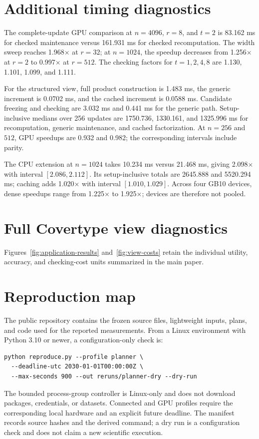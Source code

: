 \documentclass[10pt]{article}
\begin{document}
\section{Additional timing diagnostics}
The complete-update GPU comparison at $n=4096$, $r=8$, and $t=2$ is
83.162 ms for checked maintenance versus 161.931 ms for checked
recomputation. The width sweep reaches 1.968$\times$ at $r=32$; at
$n=1024$, the speedup decreases from 1.256$\times$ at $r=2$ to
0.997$\times$ at $r=512$. The checking factors for $t=1,2,4,8$ are
1.130, 1.101, 1.099, and 1.111.

For the structured view, full product construction is 1.483 ms, the generic
increment is 0.0702 ms, and the cached increment is 0.0588 ms. Candidate
freezing and checking are 3.032 ms and 0.441 ms for the generic path.
Setup-inclusive medians over 256 updates are 1750.736, 1330.161, and
1325.996 ms for recomputation, generic maintenance, and cached
factorization. At $n=256$ and $512$, GPU speedups are 0.932 and 0.982;
the corresponding intervals include parity.

The CPU extension at $n=1024$ takes 10.234 ms versus 21.468 ms,
giving 2.098$\times$ with interval $[2.086,2.112]$. Its setup-inclusive
totals are 2645.888 and 5520.294 ms; caching adds 1.020$\times$ with
interval $[1.010,1.029]$. Across four GB10 devices, dense speedups range
from 1.225$\times$ to 1.925$\times$; devices are therefore not pooled.

\section{Full Covertype view diagnostics}
Figures~\ref{fig:application-results} and~\ref{fig:view-costs} retain the
individual utility, accuracy, and checking-cost units summarized in the main paper.



\section{Reproduction map}
The public repository contains the frozen source files, lightweight inputs,
plans, and code used for the reported measurements. From a Linux environment
with Python 3.10 or newer, a configuration-only check is:
\begin{verbatim}
python reproduce.py --profile planner \
  --deadline-utc 2030-01-01T00:00:00Z \
  --max-seconds 900 --out reruns/planner-dry --dry-run
\end{verbatim}
The bounded process-group controller is Linux-only and does not download
packages, credentials, or datasets. Connected and GPU profiles require the
corresponding local hardware and an explicit future deadline. The manifest
records source hashes and the derived command; a dry run is a configuration
check and does not claim a new scientific execution.



\end{document}
